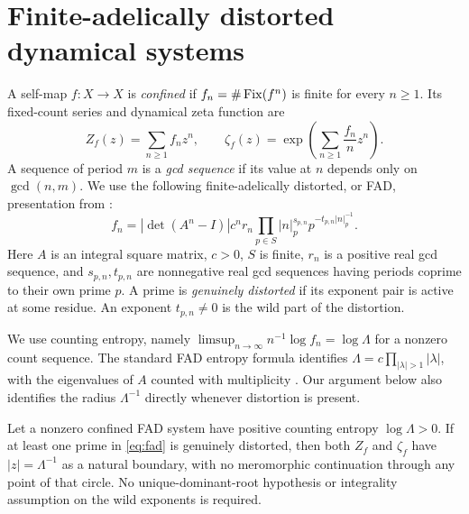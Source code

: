 \section{Finite-adelically distorted dynamical systems}
\label{sec:dynamics}

A self-map \(f:X\to X\) is \emph{confined} if
\(f_n=\#\operatorname{Fix}(f^n)\) is finite for every \(n\geq1\).
Its fixed-count series and dynamical zeta function are
\[
Z_f(z)=\sum_{n\geq1}f_nz^n,\qquad
\zeta_f(z)=\exp\left(\sum_{n\geq1}\frac{f_n}{n}z^n\right).
\]
A sequence of period \(m\) is a \emph{gcd sequence} if its value at \(n\)
depends only on \(\gcd(n,m)\). We use the following finite-adelically
distorted, or FAD, presentation from
\citep[Definitions 7.1.1--7.1.2]{bch2024}:
\begin{equation}\label{eq:fad}
f_n=|\det(A^n-I)|c^nr_n
\prod_{p\in S}|n|_p^{s_{p,n}}
p^{-t_{p,n}|n|_p^{-1}}.
\end{equation}
Here \(A\) is an integral square matrix, \(c>0\), \(S\) is finite,
\(r_n\) is a positive real gcd sequence, and \(s_{p,n},t_{p,n}\)
are nonnegative real gcd sequences having periods coprime to their
own prime \(p\). A prime is \emph{genuinely distorted} if its exponent
pair is active at some residue. An exponent \(t_{p,n}\ne0\) is the
wild part of the distortion.

We use counting entropy, namely
\(\limsup_{n\to\infty}n^{-1}\log f_n=\log\Lambda\) for a nonzero
count sequence. The standard FAD entropy formula identifies
\(\Lambda=c\prod_{|\lambda|>1}|\lambda|\), with the eigenvalues of
\(A\) counted with multiplicity
\citep[Section 10.3]{bch2024}.
Our argument below also identifies the radius \(\Lambda^{-1}\)
directly whenever distortion is present.

\begin{corollary}\label{cor:fad}
Let a nonzero confined FAD system have positive counting entropy
\(\log\Lambda>0\). If at least one prime in \eqref{eq:fad} is genuinely
distorted, then both \(Z_f\) and \(\zeta_f\) have
\(|z|=\Lambda^{-1}\) as a natural boundary, with no meromorphic
continuation through any point of that circle.
No unique-dominant-root hypothesis or integrality assumption on
the wild exponents is required.
\end{corollary}

